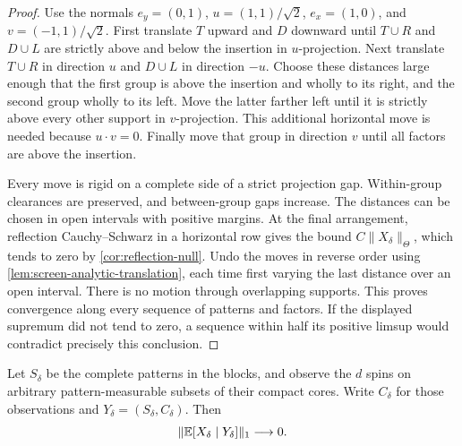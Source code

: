 \begin{proof}
Use the normals $e_y=(0,1)$, $u=(1,1)/\sqrt2$, $e_x=(1,0)$, and
$v=(-1,1)/\sqrt2$. First translate $T$ upward and $D$ downward until
$T\cup R$ and $D\cup L$ are strictly above and below the insertion in
$u$-projection. Next translate $T\cup R$ in direction $u$ and $D\cup L$
in direction $-u$. Choose these distances large enough that the first
group is above the insertion and wholly to its right, and the second
group wholly to its left. Move the latter farther left until it is
strictly above every other support in $v$-projection. This additional
horizontal move is needed because $u\cdot v=0$. Finally move that group
in direction $v$ until all factors are above the insertion.

Every move is rigid on a complete side of a strict projection gap.
Within-group clearances are preserved, and between-group gaps increase.
The distances can be chosen in open intervals with positive margins.
At the final arrangement, reflection Cauchy--Schwarz in a horizontal
row gives the bound $C\|X_\delta\|_\Theta$, which tends to zero by
\cref{cor:reflection-null}. Undo the moves in reverse order using
\cref{lem:screen-analytic-translation}, each time first varying the last
distance over an open interval. There is no motion through overlapping
supports. This proves convergence along every sequence of patterns and
factors. If the displayed supremum did not tend to zero, a sequence
within half its positive limsup would contradict precisely this
conclusion.
\end{proof}

\begin{lemma}
\label{lem:screen-core-colors}
Let $S_\delta$ be the complete patterns in the blocks, and observe the
$d$ spins on arbitrary pattern-measurable subsets of their compact cores.
Write $C_\delta$ for those observations and
$Y_\delta=(S_\delta,C_\delta)$. Then
\begin{equation}
 \|\mathbb E[X_\delta\mid Y_\delta]\|_1\longrightarrow0.
 \label{eq:screen-core-orthogonality}
\end{equation}
\end{lemma}

